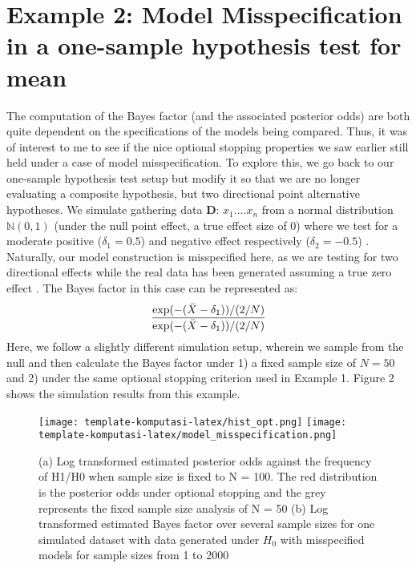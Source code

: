 \documentclass{article}
\begin{document}
\section{Example 2: Model Misspecification in a one-sample hypothesis test for mean}

The computation of the Bayes factor (and the associated posterior odds) are both quite dependent on the specifications of the models being compared. Thus, it was of interest to me to see if the nice optional stopping properties we saw earlier still held under a case of model misspecification. To explore this, we go back to our one-sample hypothesis test setup but modify it so that we are no longer evaluating a composite hypothesis, but two directional point alternative hypotheses. We simulate gathering data $\textbf{D}$: $x_1....x_n$ from a normal distribution $\mathbb{N}(0, 1)$ (under the null point effect, a true effect size of 0) where we test for a moderate positive ($\delta_1 = 0.5$) and negative effect respectively ($\delta_2 = -0.5$) \cite{rounder, wage, hill}. Naturally, our model construction is misspecified here, as we are testing for two directional effects while the real data has been generated assuming a true zero effect \cite{wage}. The Bayes factor in this case can be represented as: 
\begin{equation}
\frac{\textnormal{exp}(-(\bar{X}-\delta_1))/(2/N)}{\textnormal{exp}(-(\bar{X}-\delta_1))/(2/N)}
\end{equation}
Here, we follow a slightly different simulation setup, wherein we sample from the null and then calculate the Bayes factor under 1) a fixed sample size of $N = 50$ and 2) under the same optional stopping criterion used in Example 1. Figure 2 shows the simulation results from this example. 

\begin{figure}[H]

\centering
\texttt{[image: template-komputasi-latex/hist\_opt.png]}\hfill
\texttt{[image: template-komputasi-latex/model\_misspecification.png]}\hfill

\caption{(a) Log transformed estimated posterior odds against the frequency of H1/H0 when sample size is fixed to N = 100. The red distribution is the posterior odds under optional stopping and the grey represents the fixed sample size analysis of N = 50  (b) Log transformed estimated Bayes factor over several sample sizes for one simulated dataset with data generated under $H_0$ with misspecified models for sample sizes from 1 to 2000}
\label{fig:figure3}

\end{figure}
\end{document}

